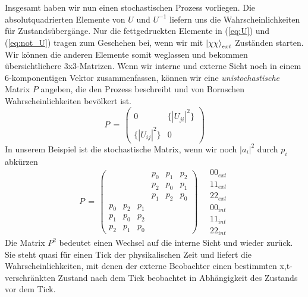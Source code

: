 \documentclass[12pt]{article}
\begin{document}
Insgesamt haben wir nun einen stochastischen Prozess vorliegen. Die absolutquadrierten Elemente von $U$ und $U^{-1}$ liefern uns die Wahrscheinlichkeiten für Zustandsübergänge. Nur die fettgedruckten Elemente in (\ref{eq:U}) und (\ref{eq:not_U}) tragen zum Geschehen bei, wenn wir mit $\ket{\chi\chi}_{ext}$ Zuständen starten. Wir können die anderen Elemente somit weglassen und bekommen übersichtlichere 3x3-Matrizen. Wenn wir interne und externe Sicht noch in einem 6-komponentigen Vektor zusammenfassen, können wir eine \emph{unistochastische} Matrix $P$ angeben, die den Prozess beschreibt und von Bornschen Wahrscheinlichkeiten bevölkert ist.
\begin{equation}
P\, =\,
\begin{pmatrix}
0 & \{|U_{ji}|^2\} \\
\{|U_{ij}|^2\} & 0
\end{pmatrix}
\end{equation}
In unserem Beispiel ist die stochastische Matrix, wenn wir noch $|a_i|^2$ durch $p_i$ abkürzen
\begin{equation}
P\, =\,
\begin{pmatrix}
&&& p_0 & p_1 & p_2 \\
&&& p_2 & p_0 & p_1 \\
&&& p_1 & p_2 & p_0 \\
p_0 & p_2 & p_1 &&& \\
p_1 & p_0 & p_2 &&& \\
p_2 & p_1 & p_0 &&& 
\end{pmatrix}
\quad
\begin{matrix}
00_{ext} \\ 11_{ext} \\ 22_{ext} \\ 00_{int} \\ 11_{int} \\ 22_{int}
\end{matrix}
\end{equation}
Die Matrix $P^2$ bedeutet einen Wechsel auf die interne Sicht und wieder zurück. Sie steht quasi für einen Tick der physikalischen Zeit und liefert die Wahrscheinlichkeiten, mit denen der externe Beobachter einen bestimmten x,t-verschränkten Zustand nach dem Tick beobachtet in Abhängigkeit des Zustands vor dem Tick.
\end{document}
